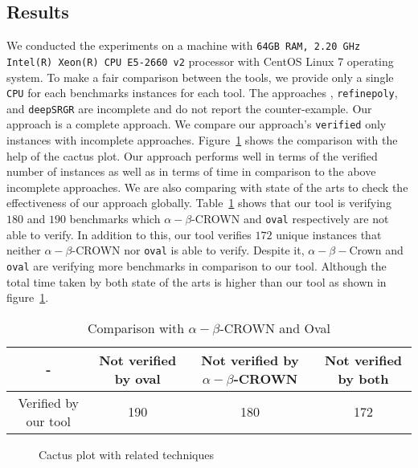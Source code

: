 \subsection{Results}
We conducted the experiments on a machine with \texttt{64GB RAM, 2.20 GHz Intel(R) Xeon(R) CPU E5-2660 v2}
processor with CentOS Linux 7 operating system. 
To make a fair comparison between the tools, we provide only a single \texttt{CPU} for each benchmarks instances for each tool. 
The approaches \deeppoly{}, \texttt{refinepoly}, and \texttt{deepSRGR} are incomplete and do not report the counter-example. 
Our approach is a complete approach. We compare our approach's \texttt{verified} only instances with incomplete approaches. 
Figure~\ref{res:milp_with_milp} shows the comparison with the help of the cactus plot. Our approach performs well 
in terms of the verified number of instances as well as in terms of time in comparison to the above incomplete approaches. 
We are also comparing with state of the arts to check the effectiveness of our approach globally.
Table~\ref{tb:soacomparison} shows that our tool is verifying $180$ and $190$ benchmarks which $\alpha -\beta$-CROWN and 
\texttt{oval} respectively are not able to verify. In addition to this, our tool verifies $172$ unique instances 
that neither $\alpha -\beta$-CROWN nor \texttt{oval} is able to verify.  
Despite it, $\alpha - \beta-$Crown and \texttt{oval} are verifying more benchmarks in comparison to our tool. 
Although the total time taken by both state of the arts is higher than our tool as shown in figure~\ref{res:milp_with_milp}. 


\begin{table}
    \centering
    \begin{tabular}{|c|c|c|c|}
        \hline
        -  & Not verified by oval & Not verified by $\alpha - \beta$-CROWN & Not verified by both \\
        \hline
        Verified by our tool & 190 & 180 & 172 \\
        \hline
    \end{tabular}
    \caption{Comparison with $\alpha - \beta$-CROWN and Oval}
    \label{tb:soacomparison}
\end{table}



\begin{figure}
    \centering
    
    \caption{Cactus plot with related techniques}
    \label{res:milp_with_milp}
\end{figure}


